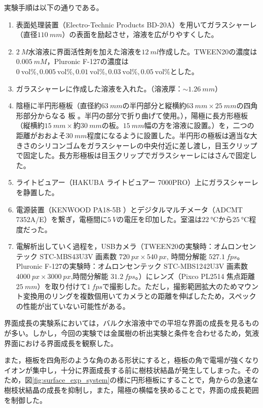 \documentclass[autodetect-engine,dvi=dvipdfmx,a4paper,ja=standard,oneside,openany,11pt]{bxjsbook}
\begin{document}
実験手順は以下の通りである。
\begin{enumerate}
  \item 表面処理装置（Electro-Technic Products BD-20A）を用いてガラスシャーレ（直径$\SI{110}{mm}$）の表面を励起させ，溶液を広がりやすくした。
  \item  {} $\SI{2}{M}$水溶液に界面活性剤を加えた溶液を$\SI{12}{ml}$作成した。TWEEN20の濃度は$\SI{0.005}{mM}$，Pluronic F-127の濃度は$\SI{0}{\mathrm{vol}\%}, \SI{0.005}{\mathrm{vol}\%}, \SI{0.01}{\mathrm{vol}\%}, \SI{0.03}{\mathrm{vol}\%}, \SI{0.05}{\mathrm{vol}\%}$とした。
  \item ガラスシャーレに作成した溶液を入れた。（溶液厚：$\sim\SI{1.26}{mm}$）
  \item 陰極に半円形極板（直径約$\SI{63}{mm}$の半円部分と縦横約$\SI{63}{mm}\times \SI{25}{mm}$の四角形部分からなる 板 。半円の部分で折り曲げて使用。），陽極に長方形極板（縦横約$\SI{15}{mm}\times$約$\SI{30}{mm}$の板。$\SI{15}{mm}$幅の方を溶液に設置。）を，二つの距離がおおよそ$\SI{30}{mm}$程度になるように設置した。半円形の極板は適当な大きさのシリコンゴムをガラスシャーレの中央付近に差し渡し，目玉クリップで固定した。長方形極板は目玉クリップでガラスシャーレにはさんで固定した。
  \item ライトビュアー（HAKUBA ライトビュアー 7000PRO）上にガラスシャーレを静置した。
  \item 電源装置（KENWOOD PA18-5B ）とデジタルマルチメータ（ADCMT 7352A/E）を繋ぎ，電極間に$\SI{5}{V}$の電圧を印加した。室温は$\SI{22}{\degreeCelsius}$から$\SI{25}{\degreeCelsius}$程度だった。
  \item 電解析出していく過程を，USBカメラ（TWEEN20の実験時：オムロンセンテック STC-MBS43U3V 画素数 $\SI{720}{px} \times \SI{540}{px}$, 時間分解能 $\SI{527.1}{fps}$。Pluronic F-127の実験時：オムロンセンテック STC-MBS1242U3V 画素数 $\SI{4000}{px} \times \SI{3000}{px}$,時間分解能 $\SI{31.2}{fps}$。）にレンズ（Pixco PL2514 焦点距離$\SI{25}{mm}$）を取り付けて$\SI{1}{fps}$で撮影した。ただし，撮影範囲拡大のためマウント変換用のリングを複数個用いてカメラとの距離を伸ばしたため，スペックの性能が出ていない可能性がある。
\end{enumerate}

界面成長の実験系においては，バルク水溶液中での平坦な界面の成長を見るものが多い\cite{schilardi1998evolution}。しかし，今回の実験では金属樹の析出実験と条件を合わせるため，気液界面における界面成長を観察した。

また，極板を四角形のような角のある形状にすると，極板の角で電場が強くなりイオンが集中し，十分に界面成長する前に樹枝状結晶が発生してしまった。そのため，図\ref{fig:surface_exp_system}の様に円形極板にすることで，角からの急速な樹枝状結晶の成長を抑制し，また，陽極の横幅を狭めることで，界面の成長範囲を制御した。
\end{document}
